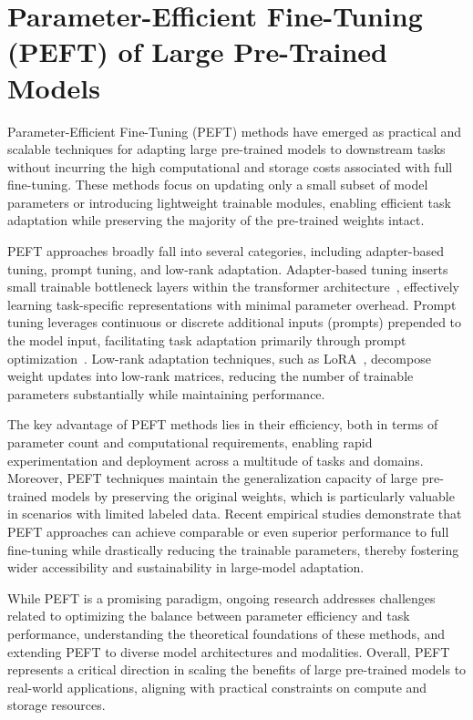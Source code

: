 \documentclass[sigconf]{acmart}
\begin{document}
\section{Parameter-Efficient Fine-Tuning (PEFT) of Large Pre-Trained Models}
Parameter-Efficient Fine-Tuning (PEFT) methods have emerged as practical and scalable techniques for adapting large pre-trained models to downstream tasks without incurring the high computational and storage costs associated with full fine-tuning. These methods focus on updating only a small subset of model parameters or introducing lightweight trainable modules, enabling efficient task adaptation while preserving the majority of the pre-trained weights intact.

PEFT approaches broadly fall into several categories, including adapter-based tuning, prompt tuning, and low-rank adaptation. Adapter-based tuning inserts small trainable bottleneck layers within the transformer architecture~\cite{adaptercitation}, effectively learning task-specific representations with minimal parameter overhead. Prompt tuning leverages continuous or discrete additional inputs (prompts) prepended to the model input, facilitating task adaptation primarily through prompt optimization~\cite{prompttuningcitation}. Low-rank adaptation techniques, such as LoRA~\cite{loracitation}, decompose weight updates into low-rank matrices, reducing the number of trainable parameters substantially while maintaining performance.

The key advantage of PEFT methods lies in their efficiency, both in terms of parameter count and computational requirements, enabling rapid experimentation and deployment across a multitude of tasks and domains. Moreover, PEFT techniques maintain the generalization capacity of large pre-trained models by preserving the original weights, which is particularly valuable in scenarios with limited labeled data. Recent empirical studies demonstrate that PEFT approaches can achieve comparable or even superior performance to full fine-tuning while drastically reducing the trainable parameters, thereby fostering wider accessibility and sustainability in large-model adaptation.

While PEFT is a promising paradigm, ongoing research addresses challenges related to optimizing the balance between parameter efficiency and task performance, understanding the theoretical foundations of these methods, and extending PEFT to diverse model architectures and modalities. Overall, PEFT represents a critical direction in scaling the benefits of large pre-trained models to real-world applications, aligning with practical constraints on compute and storage resources.
\end{document}
